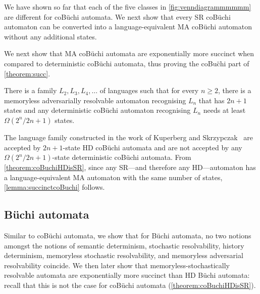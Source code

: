 We have shown so far that each of the five classes in \cref{fig:venndiagrammmmmm} are different for coB\"uchi automata. We next show that every SR coB\"uchi automaton can be converted into a language-equivalent MA coB\"uchi automaton without any additional states.



We next show that MA coB\"uchi automata are exponentially more succinct when compared to deterministic coB\"uchi automata, thus proving the coBu\"chi part of \cref{theorem:succ}.
\begin{corollary}\label{lemma:succinctcoBuchi}
    There is a family $L_2,L_3,L_4,\dots$ of languages such that for every $n\geq 2$, there is a memoryless adversarially resolvable automaton recognising $L_n$ that has $2n+1$ states and any deterministic coB\"uchi automaton recognising $L_n$ needs at least $\Omega(2^n/2n+1)$ states. 
\end{corollary}
The language family constructed in the work of Kuperberg and Skrzypczak~\cite[Theorem~1]{KS15} are accepted by $2n+1$-state HD coB\"uchi automata and are not accepted by any $\Omega(2^n/2n+1)$-state deterministic coB\"uchi automata. From \cref{theorem:coBuchiHDisSR}, since any SR---and therefore any HD---automaton has a language-equivalent MA automaton with the same number of states, \cref{lemma:succinctcoBuchi} follows. 
\subsection{B\"uchi automata}\label{subsec:sac-buchi}
Similar to coB\"uchi automata, we show that for B\"uchi automata, no two notions amongst the notions of semantic determinism, stochastic resolvability, history determinism, memoryless stochastic resolvability, and memoryless adversarial resolvability coincide. We then later show that memoryless-stochastically resolvable automata are exponentially more succinct than HD B\"uchi automata: recall that this is not the case for coB\"uchi automata (\cref{theorem:coBuchiHDisSR}).

